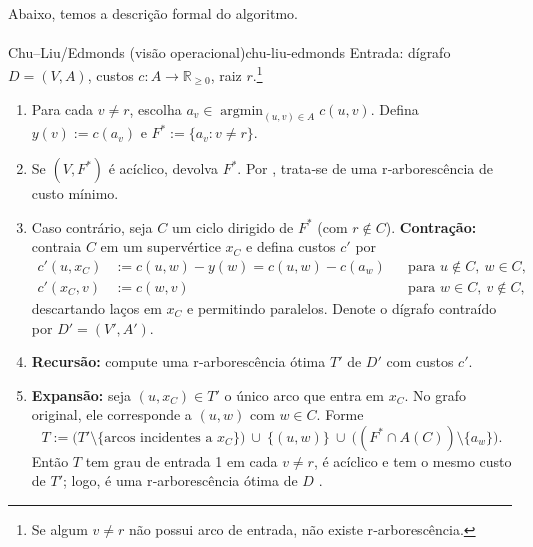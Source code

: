 \documentclass[12pt,a4paper]{article}
\begin{document}
\paragraph{}
Abaixo, temos a descrição formal do algoritmo.
\paragraph{}
\begin{algobox}{Chu–Liu/Edmonds (visão operacional)}{chu-liu-edmonds}
Entrada: dígrafo \(D=(V,A)\), custos \(c:A\to\mathbb{R}_{\ge 0}\), raiz \(r\).\footnote{Se algum \(v\neq r\) não possui arco de entrada, não existe r‑arborescência.}
\begin{enumerate}\setlength{\itemsep}{2pt}
    \item Para cada \(v\neq r\), escolha \(a_v\in\operatorname*{argmin}_{(u,v)\in A} c(u,v)\). Defina \(y(v):=c(a_v)\) e \(F^*:=\{a_v: v\neq r\}.\)
    \item Se \((V,F^*)\) é acíclico, devolva \(F^*\). Por \cite[Obs.~4.36]{kleinberg2006}, trata‑se de uma r‑arborescência de custo mínimo.
    \item Caso contrário, seja \(C\) um ciclo dirigido de \(F^*\) (com \(r\notin C\)). \textbf{Contração:} contraia \(C\) em um supervértice \(x_C\) e defina custos \(c'\) por
    \begin{align*}
        c'(u,x_C) &:= c(u,w) - y(w) = c(u,w) - c(a_w) && \text{para } u\notin C,\ w\in C, \\
        c'(x_C,v) &:= c(w,v) && \text{para } w\in C,\ v\notin C,
    \end{align*}
    descartando laços em \(x_C\) e permitindo paralelos. Denote o dígrafo contraído por \(D'=(V',A')\).
    \item \textbf{Recursão:} compute uma r‑arborescência ótima \(T'\) de \(D'\) com custos \(c'\).
    \item \textbf{Expansão:} seja \((u,x_C)\in T'\) o único arco que entra em \(x_C\). No grafo original, ele corresponde a \((u,w)\) com \(w\in C\). Forme
    \[
        T := \bigl(T'\setminus\{\text{arcos incidentes a } x_C\}\bigr)\ \cup\ \{(u,w)\}\ \cup\ \bigl((F^*\cap A(C))\setminus\{a_w\}\bigr).
    \]
    Então \(T\) tem grau de entrada 1 em cada \(v\neq r\), é acíclico e tem o mesmo custo de \(T'\); logo, é uma r‑arborescência ótima de \(D\) \cite[Sec.~4.9]{kleinberg2006,schrijver2003comb}.
\end{enumerate}
\end{algobox}
\end{document}
